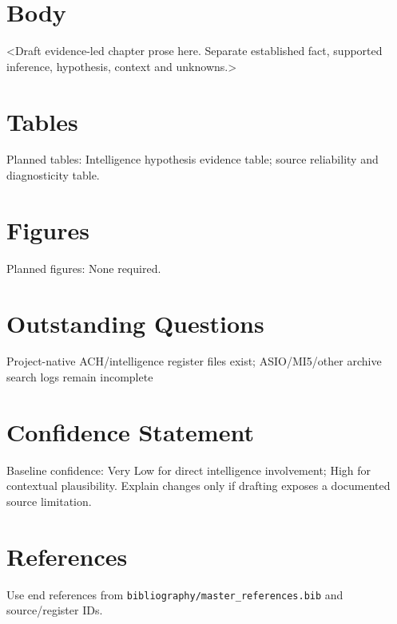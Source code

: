 \section{Body}
<Draft evidence-led chapter prose here. Separate established fact, supported inference, hypothesis, context and unknowns.>

\section{Tables}
Planned tables: Intelligence hypothesis evidence table; source reliability and diagnosticity table.

\section{Figures}
Planned figures: None required.

\section{Outstanding Questions}
Project-native ACH/intelligence register files exist; ASIO/MI5/other archive search logs remain incomplete

\section{Confidence Statement}
Baseline confidence: Very Low for direct intelligence involvement; High for contextual plausibility. Explain changes only if drafting exposes a documented source limitation.

\section{References}
Use end references from \texttt{bibliography/master_references.bib} and source/register IDs.
